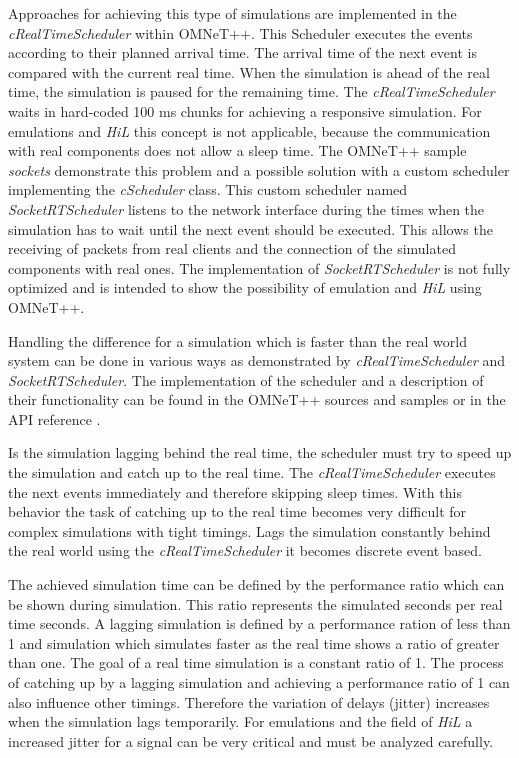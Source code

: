 Approaches for achieving this type of simulations are implemented in the \emph{cRealTimeScheduler} within OMNeT++.
This Scheduler executes the events according to their planned arrival time.
The arrival time of the next event is compared with the current real time.
When the simulation is ahead of the real time, the simulation is paused for the remaining time.
The \emph{cRealTimeScheduler} waits in hard-coded 100 ms chunks for achieving a responsive simulation.
For emulations and \emph{HiL} this concept is not applicable, because the communication with real components does not allow a sleep time.
The OMNeT++ sample \emph{sockets} demonstrate this problem and a possible solution with a custom scheduler implementing the \emph{cScheduler} class.
This custom scheduler named \emph{SocketRTScheduler} listens to the network interface during the times when the simulation has to wait until the next event should be executed.
This allows the receiving of packets from real clients and the connection of the simulated components with real ones.
The implementation of \emph{SocketRTScheduler} is not fully optimized and is intended to show the possibility of emulation and \emph{HiL} using OMNeT++.

Handling the difference for a simulation which is faster than the real world system can be done in various ways as demonstrated by \emph{cRealTimeScheduler} and \emph{SocketRTScheduler}.
The implementation of the scheduler and a description of their functionality can be found in the OMNeT++ sources and samples or in the API reference \cite{OMNETAPIREF}.

Is the simulation lagging behind the real time, the scheduler must try to speed up the simulation and catch up to the real time.
The \emph{cRealTimeScheduler} executes the next events immediately and therefore skipping sleep times.
With this behavior the task of catching up to the real time becomes very difficult for complex simulations with tight timings.
Lags the simulation constantly behind the real world using the \emph{cRealTimeScheduler} it becomes discrete event based.

The achieved simulation time can be defined by the performance ratio which can be shown during simulation.
This ratio represents the simulated seconds per real time seconds.
A lagging simulation is defined by a performance ration of less than 1 and simulation which simulates faster as the real time shows a ratio of greater than one.
The goal of a real time simulation is a constant ratio of 1.
The process of catching up by a lagging simulation and achieving a performance ratio of 1 can also influence other timings.
Therefore the variation of delays (jitter) increases when the simulation lags temporarily.
For emulations and the field of \emph{HiL} a increased jitter for a signal can be very critical and must be analyzed carefully.

